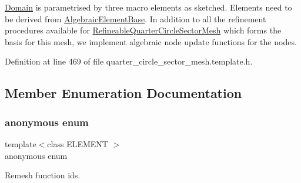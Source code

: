 \hyperlink{classoomph_1_1Domain}{Domain} is parametrised by three macro elements as sketched. Elements need to be derived from \hyperlink{classoomph_1_1AlgebraicElementBase}{Algebraic\+Element\+Base}. In addition to all the refinement procedures available for \hyperlink{classoomph_1_1RefineableQuarterCircleSectorMesh}{Refineable\+Quarter\+Circle\+Sector\+Mesh} which forms the basis for this mesh, we implement algebraic node update functions for the nodes. 

Definition at line 469 of file quarter\+\_\+circle\+\_\+sector\+\_\+mesh.\+template.\+h.



\subsection{Member Enumeration Documentation}
\mbox{\label{classoomph_1_1AlgebraicRefineableQuarterCircleSectorMesh_ae985eaa6e1dda81c4e2ee092aab35151}} 
\subsubsection{\texorpdfstring{anonymous enum}{anonymous enum}}
{\footnotesize\ttfamily template$<$class E\+L\+E\+M\+E\+NT $>$ \\
anonymous enum\hspace{0.3cm}{\ttfamily [private]}}



Remesh function ids. 

